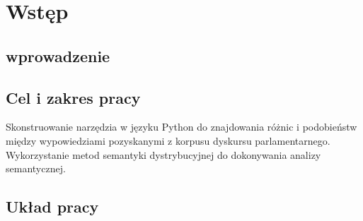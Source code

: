 
\chapter{Wstęp}\label{sec:wprowadzenie}

\section{wprowadzenie}

\section{Cel i zakres pracy}
	Skonstruowanie narzędzia w języku Python do znajdowania różnic i podobieństw między wypowiedziami pozyskanymi z korpusu dyskursu parlamentarnego.
	Wykorzystanie metod semantyki dystrybucyjnej do dokonywania analizy semantycznej.

\section{Układ pracy}
